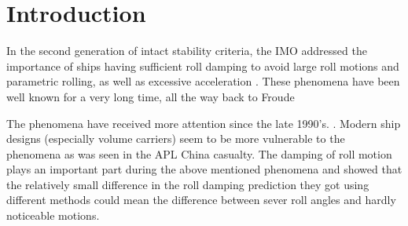 \section{Introduction}
\label{se:introduction}

In the second generation of intact stability criteria, the IMO addressed the importance of ships having sufficient roll damping to avoid large roll motions and parametric rolling, as well as excessive acceleration \parencite{imo_finalization_2016}. These phenomena have been well known for a very long time, all the way back to Froude


The phenomena have received more attention since the late 1990’s. \parencite{galeazzi_early_2013}.
Modern ship designs (especially volume carriers) seem to be more vulnerable to the phenomena as was seen in the APL China casualty. The damping of roll motion plays an important part during the above mentioned phenomena and \parencite{soder_ikeda_2019} showed that the relatively small difference in the roll damping prediction they got using different methods could mean the difference between sever roll angles and hardly noticeable motions. 


